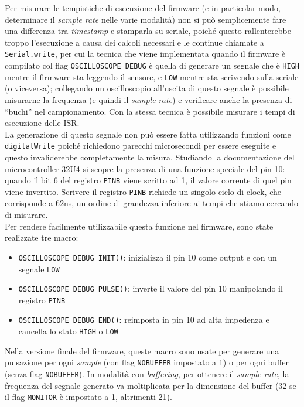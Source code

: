 Per misurare le tempistiche di esecuzione del firmware (e in particolar modo, determinare il \textit{sample rate} nelle varie modalità) non si può semplicemente fare una differenza tra \textit{timestamp} e stamparla su seriale, poiché questo rallenterebbe troppo l'esecuzione a causa dei calcoli necessari e le continue chiamate a \texttt{Serial.write}, per cui la tecnica che viene implementata quando il firmware è compilato col flag \texttt{OSCILLOSCOPE\_DEBUG} è quella di generare un segnale che è \texttt{HIGH} mentre il firmware sta leggendo il sensore, e \texttt{LOW} mentre sta scrivendo sulla seriale (o viceversa); collegando un oscilloscopio all'uscita di questo segnale è possibile misurarne la frequenza (e quindi il \textit{sample rate}) e verificare anche la presenza di ``buchi'' nel campionamento. Con la stessa tecnica è possibile misurare i tempi di esecuzione delle ISR.\\
La generazione di questo segnale non può essere fatta utilizzando funzioni come \texttt{digitalWrite} poiché richiedono parecchi microsecondi per essere eseguite e questo invaliderebbe completamente la misura. Studiando la documentazione del microcontroller 32U4 si scopre la presenza di una funzione speciale del pin 10: quando il bit 6 del registro \texttt{PINB} viene scritto ad 1, il valore corrente di quel pin viene invertito\cite{atmega32u4_datasheet}. Scrivere il registro \texttt{PINB} richiede un singolo ciclo di clock, che corrisponde a 62ns, un ordine di grandezza inferiore ai tempi che stiamo cercando di misurare.\\
Per rendere facilmente utilizzabile questa funzione nel firmware, sono state realizzate tre macro:
\begin{itemize}
	\item \texttt{OSCILLOSCOPE\_DEBUG\_INIT()}: inizializza il pin 10 come output e con un segnale \texttt{LOW}
	\item \texttt{OSCILLOSCOPE\_DEBUG\_PULSE()}: inverte il valore del pin 10 manipolando il registro \texttt{PINB}
	\item \texttt{OSCILLOSCOPE\_DEBUG\_END()}: reimposta in pin 10 ad alta impedenza e cancella lo stato \texttt{HIGH} o \texttt{LOW}
\end{itemize}
Nella versione finale del firmware, queste macro sono usate per generare una pulsazione per ogni \textit{sample} (con flag \texttt{NOBUFFER} impostato a 1) o per ogni buffer (senza flag \texttt{NOBUFFER}). In modalità con \textit{buffering}, per ottenere il \textit{sample rate}, la frequenza del segnale generato va moltiplicata per la dimensione del buffer (32 se il flag \texttt{MONITOR} è impostato a 1, altrimenti 21).

